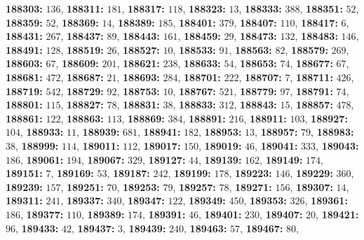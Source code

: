 \textsf{\bfseries 188303:} $136$, \textsf{\bfseries 188311:} $181$, \textsf{\bfseries 188317:} $118$, \textsf{\bfseries 188323:} $13$, \textsf{\bfseries 188333:} $388$, \textsf{\bfseries 188351:} $52$, \textsf{\bfseries 188359:} $52$, \textsf{\bfseries 188369:} $14$, \textsf{\bfseries 188389:} $185$, \textsf{\bfseries 188401:} $379$, \textsf{\bfseries 188407:} $110$, \textsf{\bfseries 188417:} $6$, \textsf{\bfseries 188431:} $267$, \textsf{\bfseries 188437:} $89$, \textsf{\bfseries 188443:} $161$, \textsf{\bfseries 188459:} $29$, \textsf{\bfseries 188473:} $132$, \textsf{\bfseries 188483:} $146$, \textsf{\bfseries 188491:} $128$, \textsf{\bfseries 188519:} $26$, \textsf{\bfseries 188527:} $10$, \textsf{\bfseries 188533:} $91$, \textsf{\bfseries 188563:} $82$, \textsf{\bfseries 188579:} $269$, \textsf{\bfseries 188603:} $67$, \textsf{\bfseries 188609:} $201$, \textsf{\bfseries 188621:} $238$, \textsf{\bfseries 188633:} $54$, \textsf{\bfseries 188653:} $74$, \textsf{\bfseries 188677:} $67$, \textsf{\bfseries 188681:} $472$, \textsf{\bfseries 188687:} $21$, \textsf{\bfseries 188693:} $284$, \textsf{\bfseries 188701:} $222$, \textsf{\bfseries 188707:} $7$, \textsf{\bfseries 188711:} $426$, \textsf{\bfseries 188719:} $542$, \textsf{\bfseries 188729:} $92$, \textsf{\bfseries 188753:} $10$, \textsf{\bfseries 188767:} $521$, \textsf{\bfseries 188779:} $97$, \textsf{\bfseries 188791:} $74$, \textsf{\bfseries 188801:} $115$, \textsf{\bfseries 188827:} $78$, \textsf{\bfseries 188831:} $38$, \textsf{\bfseries 188833:} $312$, \textsf{\bfseries 188843:} $15$, \textsf{\bfseries 188857:} $478$, \textsf{\bfseries 188861:} $122$, \textsf{\bfseries 188863:} $113$, \textsf{\bfseries 188869:} $384$, \textsf{\bfseries 188891:} $216$, \textsf{\bfseries 188911:} $103$, \textsf{\bfseries 188927:} $104$, \textsf{\bfseries 188933:} $11$, \textsf{\bfseries 188939:} $681$, \textsf{\bfseries 188941:} $182$, \textsf{\bfseries 188953:} $13$, \textsf{\bfseries 188957:} $79$, \textsf{\bfseries 188983:} $38$, \textsf{\bfseries 188999:} $114$, \textsf{\bfseries 189011:} $112$, \textsf{\bfseries 189017:} $150$, \textsf{\bfseries 189019:} $46$, \textsf{\bfseries 189041:} $333$, \textsf{\bfseries 189043:} $186$, \textsf{\bfseries 189061:} $194$, \textsf{\bfseries 189067:} $329$, \textsf{\bfseries 189127:} $44$, \textsf{\bfseries 189139:} $162$, \textsf{\bfseries 189149:} $174$, \textsf{\bfseries 189151:} $7$, \textsf{\bfseries 189169:} $53$, \textsf{\bfseries 189187:} $242$, \textsf{\bfseries 189199:} $178$, \textsf{\bfseries 189223:} $146$, \textsf{\bfseries 189229:} $360$, \textsf{\bfseries 189239:} $157$, \textsf{\bfseries 189251:} $70$, \textsf{\bfseries 189253:} $79$, \textsf{\bfseries 189257:} $78$, \textsf{\bfseries 189271:} $156$, \textsf{\bfseries 189307:} $14$, \textsf{\bfseries 189311:} $241$, \textsf{\bfseries 189337:} $340$, \textsf{\bfseries 189347:} $122$, \textsf{\bfseries 189349:} $450$, \textsf{\bfseries 189353:} $326$, \textsf{\bfseries 189361:} $186$, \textsf{\bfseries 189377:} $110$, \textsf{\bfseries 189389:} $174$, \textsf{\bfseries 189391:} $46$, \textsf{\bfseries 189401:} $230$, \textsf{\bfseries 189407:} $20$, \textsf{\bfseries 189421:} $96$, \textsf{\bfseries 189433:} $42$, \textsf{\bfseries 189437:} $3$, \textsf{\bfseries 189439:} $240$, \textsf{\bfseries 189463:} $57$, \textsf{\bfseries 189467:} $80$, 
